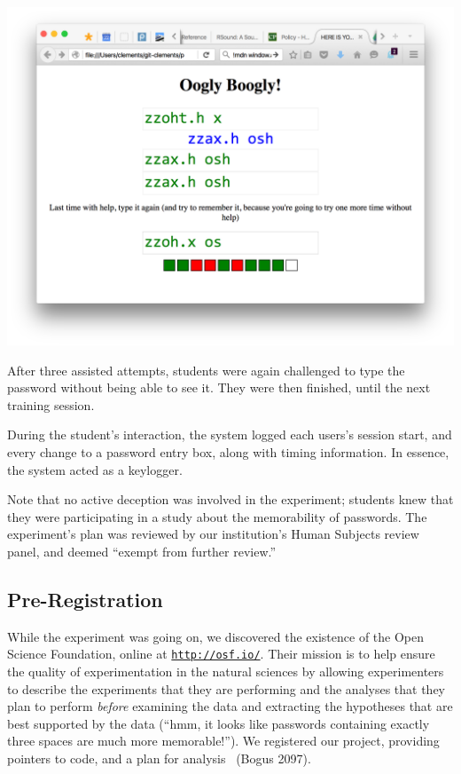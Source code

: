\documentclass[preprint]{soups}
\let\SOriginalthesubsubsection\thesubsubsection
\newcommand{\Ssubsection}[2]{\subsection[#1]{#2}\let\thesubsubsection\SOriginalthesubsubsection}
\newcommand{\Snolinkurl}[1]{\nolinkurl{#1}}
\begin{document}
\includegraphics[scale=0.27]{screenshot.png}

After three assisted attempts, students were again
challenged to type the password without being able to see
it. They were then finished, until the next training
session.

During the student{'}s interaction, the system logged each
users{'}s session start, and every change to a password entry
box, along with timing information. In essence, the system
acted as a keylogger.

Note that no active deception was involved in the
experiment; students knew that they were participating in a
study about the memorability of passwords. The experiment{'}s
plan was reviewed by our institution{'}s Human Subjects review
panel, and deemed {``}exempt from further review.{''}

\Ssubsection{Pre{-}Registration}{Pre{-}Registration}\label{t:x28part_x22Prex2dRegistrationx22x29}

While the experiment was going on, we discovered the
existence of the Open Science Foundation, online at
\href{http://osf.io/}{\Snolinkurl{http://osf.io/}}. Their mission is to help ensure the
quality of experimentation in the natural sciences by
allowing experimenters to describe the experiments that they
are performing and the analyses that they plan to perform
\textit{before} examining the data and extracting the
hypotheses that are best supported by the data ({``}hmm, it
looks like passwords containing exactly three spaces are
much more memorable!{''}). We registered our project,
providing pointers to code, and a plan for analysis
~(Bogus 2097).
\end{document}
